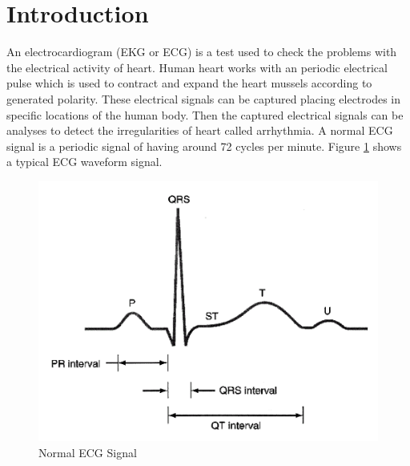 \section{Introduction}
An electrocardiogram (EKG or ECG) is a test used to check the problems with the electrical activity of heart. Human heart works with an periodic electrical pulse which is used to contract and expand the heart mussels according to generated polarity. These electrical signals can be captured placing electrodes in specific locations of the human body. Then the captured electrical signals can be analyses to detect the irregularities of heart called arrhythmia.  A normal ECG signal is a periodic signal of having around 72 cycles per minute. Figure \ref{ecg_signal} shows a typical ECG waveform signal.
\begin{figure}
        \centering
        \includegraphics[width=\textwidth]{ecg_signal.png}
        \caption{Normal ECG Signal}
        \label{ecg_signal}
\end{figure}
